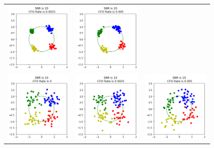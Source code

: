 \begin{figure}
\begin{tabular}{ccc}
    \includegraphics[width=50mm]{figures/cfo_intro/snr_20/cfo_1.png}&
    \includegraphics[width=50mm]{figures/cfo_intro/snr_20/cfo_2.png}\\
    \includegraphics[width=50mm]{figures/cfo_intro/snr_10/cfo_0.png}&
    \includegraphics[width=50mm]{figures/cfo_intro/snr_10/cfo_1.png}&
    \includegraphics[width=50mm]{figures/cfo_intro/snr_10/cfo_2.png}
  \end{tabular}
\end{figure}


